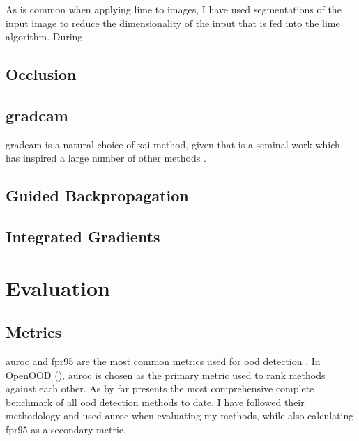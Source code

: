 \documentclass[UKenglish]{uiomasterthesis} %
\theoremstyle{definition}
\begin{document}
As is common when applying \ac{lime} to images, I have used segmentations of the input image to reduce the dimensionality of the input that is fed into the \ac{lime} algorithm. During

\subsection{Occlusion}

\subsection{\ac{gradcam}}

\ac{gradcam} is a natural choice of \ac{xai} method, given that is a seminal work which has inspired a large number of other methods \cite{gradcamplusplus, xgradcam, hirescam}.

\subsection{Guided Backpropagation}

\subsection{Integrated Gradients}

\section{Evaluation}

\subsection{Metrics}

\ac{auroc} and \ac{fpr95} are the most common metrics used for \ac{ood} detection \cite{oodbaseline, odin, oodoverview, openood, vim}. In OpenOOD (\cite{openood}), \ac{auroc} is chosen as the primary metric used to rank methods against each other. As \cite{openood} by far presents the most comprehensive complete benchmark of all \ac{ood} detection methods to date, I have followed their methodology and used \ac{auroc} when evaluating my methods, while also calculating \ac{fpr95} as a secondary metric.
\end{document}
